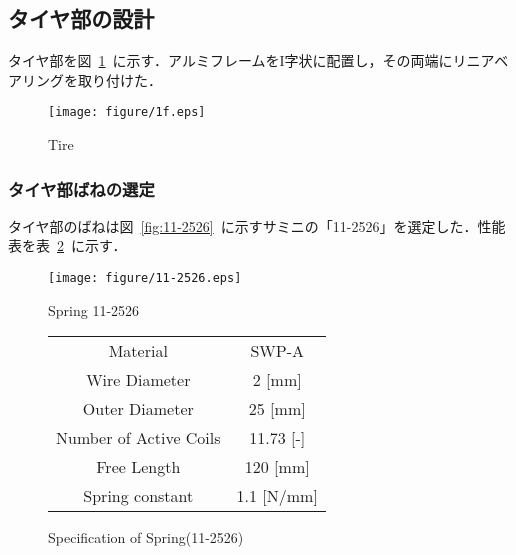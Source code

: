 \documentclass[a4paper,12pt]{article_vdlab_sotsuron}
\begin{document}
\newpage
\subsection{タイヤ部の設計}
タイヤ部を図~\ref{fig:1f}~に示す．アルミフレームをI字状に配置し，その両端にリニアベアリングを取り付けた．

\vspace*{10mm}
\begin{figure}[htp]
  \begin{center}
    \texttt{[image: figure/1f.eps]}
    \vspace*{3mm}
    \caption{Tire}
    \label{fig:1f}
  \end{center}
\end{figure}

\vspace*{10mm}
\subsubsection{タイヤ部ばねの選定}
タイヤ部のばねは図~\ref{fig:11-2526}~に示すサミニの「11-2526」を選定した．性能表を表~\ref{tab:11-2526}~に示す．

\vspace*{10mm}
\begin{figure}[htp]
  \begin{minipage}{0.5\textwidth}
    \begin{center}
      \texttt{[image: figure/11-2526.eps]}
      \vspace*{3mm}
      \caption{Spring 11-2526}
      \label{fig:11-2526}
    \end{center}
  \end{minipage}
  \begin{minipage}{0.5\textwidth}
      \begin{center}
	\makeatletter
	\def\@captype{table}   
	\makeatother
	\caption{Specification of Spring(11-2526)\cite{5}}
	\label{tab:11-2526}
	  \begin{tabular}{cc}\hline
	    Material & SWP-A \\
	    Wire Diameter & 2 [mm] \\
	    Outer Diameter & 25 [mm] \\
	    Number of Active Coils & 11.73 [-] \\
	    Free Length & 120 [mm] \\
	    Spring constant & 1.1 [N/mm] \\\hline
	  \end{tabular}  
	\end{center}
  \end{minipage}
\end{figure}
\end{document}
